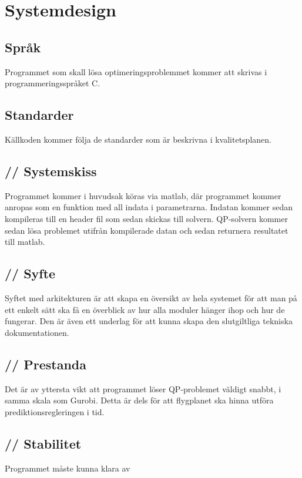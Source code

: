 \section{Systemdesign}


\subsection{Språk}
Programmet som skall lösa optimeringsproblemmet kommer att skrivas i programmeringsspråket C. 

\subsection{Standarder}
Källkoden kommer följa de standarder som är beskrivna i kvalitetsplanen.

\subsection{// Systemskiss}
Programmet kommer i huvudsak köras via matlab, där programmet kommer anropas som en funktion med all indata i parametrarna. Indatan kommer sedan kompileras till en header fil som sedan skickas till solvern. QP-solvern kommer sedan lösa problemet utifrån kompilerade datan och sedan returnera resultatet till matlab.



\subsection{// Syfte}
Syftet med arkitekturen är att skapa en översikt av hela systemet för att man på ett enkelt sätt ska få en överblick av hur alla moduler hänger ihop och hur de fungerar. Den är även ett underlag för att kunna skapa den slutgiltliga tekniska dokumentationen.

\subsection{// Prestanda}
Det är av yttersta vikt att programmet löser QP-problemet väldigt snabbt, i samma skala som Gurobi. Detta är dels för att flygplanet ska hinna utföra prediktionsregleringen i tid.

\subsection{// Stabilitet}
Programmet måste kunna klara av

